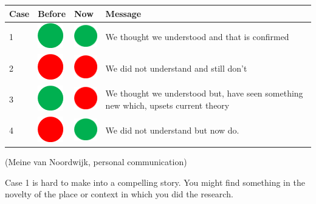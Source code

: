 \documentclass[
  titlepage]{book}
\begin{document}
\begin{longtable}[]{@{}llll@{}}
\toprule
Case & Before & Now & Message \\
\midrule
\endhead
1 & \includegraphics{img/Green dot.png} & \includegraphics{img/Green dot.png} & We thought we understood and that is confirmed \\
2 & \includegraphics{img/Red dot.png} & \includegraphics{img/Red dot.png} & We did not understand and still don't \\
3 & \includegraphics{img/Green dot.png} & \includegraphics{img/Red dot.png} & We thought we understood but, have seen something new which, upsets current theory \\
4 & \includegraphics{img/Red dot.png} & \includegraphics{img/Green dot.png} & We did not understand but now do. \\
\bottomrule
\end{longtable}

(Meine van Noordwijk, personal communication)

Case 1 is hard to make into a compelling story. You might find something in the novelty of the place or context in which you did the research.
\end{document}
